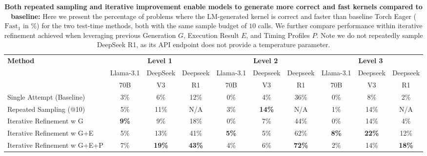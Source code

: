\begin{table*}[ht]
\vspace{-2mm}
\centering
\setlength{\tabcolsep}{2pt} %
{\small %

\begin{tabular}{l|ccc|ccc|ccc}
\toprule
\multirow{3}{*}{\textbf{Method}} & \multicolumn{3}{c|}{\textbf{Level 1}} & \multicolumn{3}{c|}{\textbf{Level 2}} & \multicolumn{3}{c}{\textbf{Level 3}} \\
 & \scriptsize{Llama-3.1} & \scriptsize{DeepSeek} & \scriptsize{Deepseek} & \scriptsize{Llama-3.1} &  \scriptsize{Deepseek} &  \scriptsize{Deepseek} &  \scriptsize{Llama-3.1} &  \scriptsize{Deepseek} &  \scriptsize{Deepseek} \\
 & \small{70B} & \small{V3} & \small{R1} & \small{70B} & \small{V3} & \small{R1} & \small{70B} & \small{V3} & \small{R1} \\
\midrule
Single Attempt (Baseline) & 3\% & 6\% & 12\% & 0\% & 4\% & 36\% & 0\% & 8\% & 2\% \\
\midrule
Repeated Sampling (@10) & 5\% & 11\% & N/A & 3\% & \textbf{14\%} & N/A & 1\% & 14\% & N/A \\
\midrule
Iterative Refinement w G & \textbf{9\%} & 9\% & 18\% & 0\% & 7\% & 44\% & 0\% & 14\% & 4\% \\
Iterative Refinement w G+E & 5\% & 13\% & 41\% & \textbf{5\%} & 5\% & 62\% & \textbf{8\%} & \textbf{22\%} & 12\% \\
Iterative Refinement w G+E+P & 7\% & \textbf{19\%} & \textbf{43\%} & 4\% & 6\% & \textbf{72\%} & 2\% & 14\% & \textbf{18\%} \\
\bottomrule
\end{tabular}
}
\caption{\textbf{Both repeated sampling and iterative improvement enable models to generate more correct and fast kernels compared to baseline:} Here we present the percentage of problems where the LM-generated kernel is correct and faster than baseline Torch Eager ($\text{Fast}_1$ in \%) for the two test-time methods, both with the same sample budget of $10$ calls. We further compare performance within iterative refinement achieved when leveraging previous Generation $G$, Execution Result $E$, and Timing Profiles $P$. Note we do not repeatedly sample DeepSeek R1, as its API endpoint does not provide a temperature parameter.}
\vspace{-2mm}
\label{table:speedup-method-comparison}
\end{table*}



